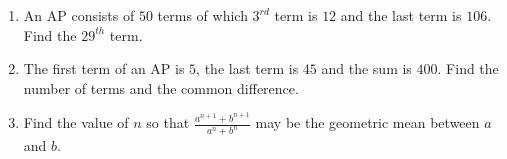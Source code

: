 \begin{enumerate}[label=\thesection.\arabic*,ref=\thesection.\theenumi]
\item An AP consists of $50$ terms of which $3^{rd}$ term is $12$ and the last term is $106$. Find the $29^{th}$ term.\\
\solution 

\pagebreak

\item The first term of an AP is $5$, the last term is $45$ and the sum is $400$. Find the number of terms and the common difference.\\
\solution
\pagebreak
\item Find the value of $n$ so that $\frac{a^{n+1} + b^{n+1}}{a^{n}+b^{n}}$ may be the geometric mean between $a$ and $b$. \\
\solution

\pagebreak
\end{enumerate}
